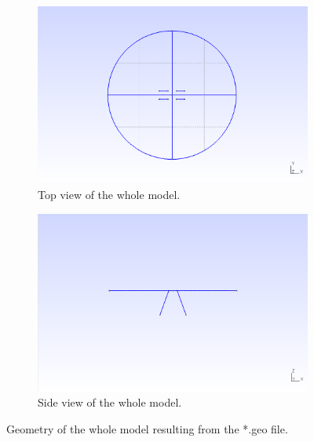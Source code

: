 \documentclass[a4]{article}
\begin{document}
\begin{figure}[tbh!]
	\centering
	\begin{subfigure}[b]{0.48\textwidth}
		\centering
		\includegraphics[width=\textwidth]{geometry_whole1.png}
		\caption{Top view of the whole model.}
		\label{fig:geometry_whole1}
	\end{subfigure}
	\begin{subfigure}[b]{0.48\textwidth}
		\centering
		\includegraphics[width=\textwidth]{geometry_whole2.png}
		\caption{Side view of the whole model.}
		\label{fig:geometry_whole2}
	\end{subfigure}
	\caption{Geometry of the whole model resulting from the *.geo file.}
\label{fig:geometry_2x2_group}
\end{figure}
\end{document}
